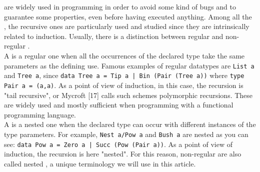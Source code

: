 \documentclass[a4paper,UKenglish,cleveref, autoref, thm-restate]{lipics}
\begin{document}
\Datatypes are widely used in programming in order to avoid some kind of bugs and to guarantee some properties, even before having executed anything. 
Among all the \datatypes, the recursive ones are particularly used and studied since they are intrinsically related to induction.
Usually, there is a distinction between regular \datatypes and non-regular \datatypes {}. \\ %
A \datatype is a regular one when all the occurrences of the declared type take the same parameters as the defining use. Famous examples of regular datatypes are \texttt{List a} and \texttt{Tree a}, since \texttt{data Tree a = Tip a | Bin (Pair (Tree a))} where \texttt{type Pair a = (a,a)}.
As a point of view of induction, in this case, the recursion is "tail recursive", or Mycroft [17] calls such schemes polymorphic recursions.
These \datatypes are widely used and mostly sufficient when programming with a functional programming language. \\
A \datatype is a nested one when the declared type can occur with different instances of the type parameters. For example, \texttt{Nest a/Pow a} and \texttt{Bush a} are nested \datatypes as you can see: \texttt{data Pow a = Zero a | Succ (Pow (Pair a))}.
As a point of view of induction, the recursion is here "nested".
For this reason, non-regular \datatypes are also called nested \datatypes, a unique terminology we will use in this article.
\end{document}
